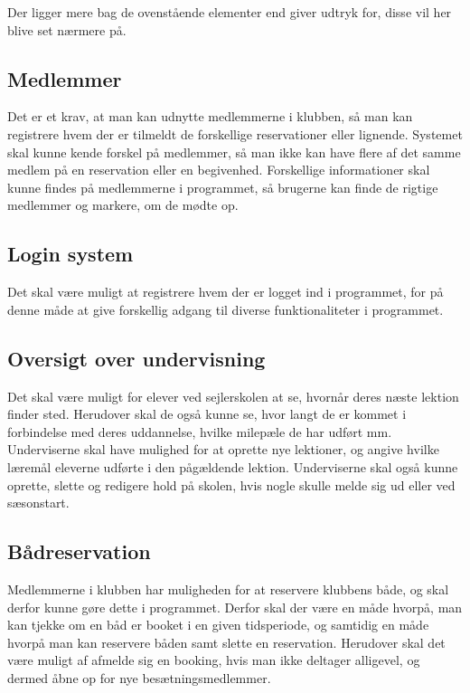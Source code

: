 Der ligger mere bag de ovenstående elementer end  giver udtryk for, disse vil her blive set nærmere på.

\subsection{Medlemmer} 

Det er et krav, at man kan udnytte medlemmerne i klubben, så man kan registrere hvem der er tilmeldt de forskellige reservationer eller lignende.
Systemet skal kunne kende forskel på medlemmer, så man ikke kan have flere af det samme medlem på en reservation eller en begivenhed.
Forskellige informationer skal kunne findes på medlemmerne i programmet, så brugerne kan finde de rigtige medlemmer og markere, om de mødte op.

\subsection{Login system} 
Det skal være muligt at registrere hvem der er logget ind i programmet, for på denne måde at give forskellig adgang til diverse funktionaliteter i programmet.

\subsection{Oversigt over undervisning}

Det skal være muligt for elever ved sejlerskolen at se, hvornår deres næste lektion finder sted.
Herudover skal de også kunne se, hvor langt de er kommet i forbindelse med deres uddannelse, hvilke milepæle de har udført mm.
Underviserne skal have mulighed for at oprette nye lektioner, og angive hvilke læremål eleverne udførte i den pågældende lektion. 
Underviserne skal også kunne oprette, slette og redigere hold på skolen, hvis nogle skulle melde sig ud eller ved sæsonstart.

\subsection{Bådreservation}

Medlemmerne i klubben har muligheden for at reservere klubbens både, og skal derfor kunne gøre dette i programmet.
Derfor skal der være en måde hvorpå, man kan tjekke om en båd er booket i en given tidsperiode, og samtidig en måde hvorpå man kan reservere båden samt slette en reservation.
Herudover skal det være muligt af afmelde sig en booking, hvis man ikke deltager alligevel, og dermed åbne op for nye besætningsmedlemmer.


